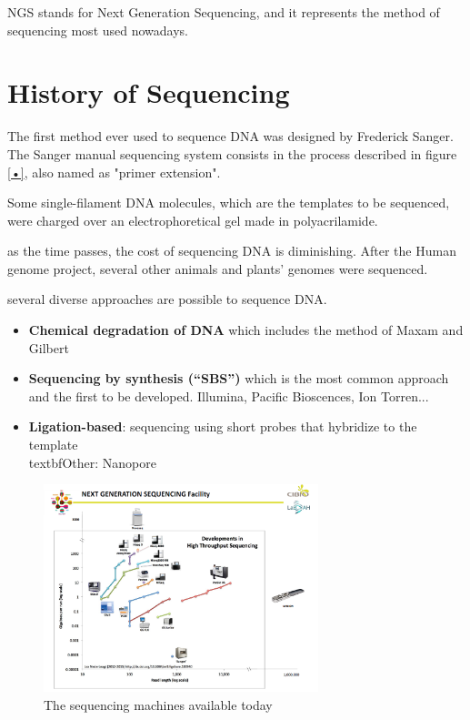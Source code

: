 \graphicspath{{chapters/images/02/}}

NGS stands for Next Generation Sequencing, and it represents the method of sequencing most used nowadays.

\section{History of Sequencing}
The first method ever used to sequence DNA was designed by Frederick Sanger. The Sanger manual sequencing system consists in the process described in figure \ref{•}, also named as "primer extension".



Some single-filament DNA molecules, which are the templates to be sequenced, were charged over an electrophoretical gel made in polyacrilamide.



as the time passes, the cost of sequencing DNA is diminishing. After the Human genome project, several other animals and plants' genomes were sequenced.

several diverse approaches are possible to sequence DNA.
\begin{itemize}
	\item \textbf{Chemical degradation of DNA} which includes the method of Maxam and Gilbert
	\item \textbf{Sequencing by synthesis (“SBS”)} which is the most common approach and the first to be developed. Illumina, Pacific Bioscences, Ion Torren...
	\item \textbf{Ligation-based}: sequencing using short probes that hybridize to the template %
	\\textbf{Other:} Nanopore
\end{itemize}

\begin{figure}[h]
\caption{The sequencing machines available today}
\centering
\includegraphics[width=8cm]{sequencingMachines}
\end{figure}





